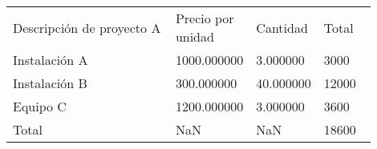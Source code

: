 \thispagestyle{empty}

\pagebreak

\thispagestyle{empty}
\empty

\pagebreak

\begin{flushright}


\vspace{10pt}


\vspace{10pt}


\begin{tabular}{C{0.5\linewidth}C{0.15\linewidth}C{0.1\linewidth}C{0.15\linewidth}}
Descripción de proyecto A & Precio por unidad & Cantidad & Total \\
Instalación A & 1000.000000 & 3.000000 & 3000 \\
Instalación B & 300.000000 & 40.000000 & 12000 \\
Equipo C & 1200.000000 & 3.000000 & 3600 \\
Total & NaN & NaN & 18600 \\
\end{tabular}

\end{flushright}
